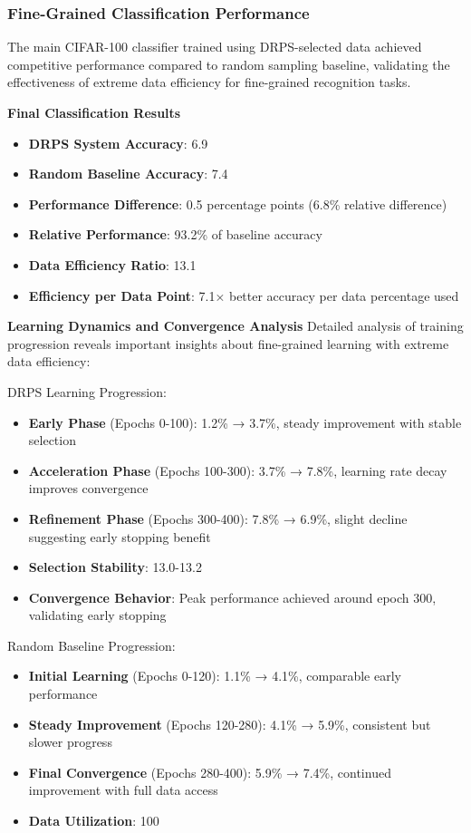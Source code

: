 \documentclass[12pt]{article}
\begin{document}
\subsubsection{Fine-Grained Classification Performance}\label{classification-performance}

The main CIFAR-100 classifier trained using DRPS-selected data achieved competitive performance compared to random sampling baseline, validating the effectiveness of extreme data efficiency for fine-grained recognition tasks.

\textbf{Final Classification Results}
\begin{itemize}
\item \textbf{DRPS System Accuracy}: 6.9%
\item \textbf{Random Baseline Accuracy}: 7.4%
\item \textbf{Performance Difference}: 0.5 percentage points (6.8\% relative difference)
\item \textbf{Relative Performance}: 93.2\% of baseline accuracy
\item \textbf{Data Efficiency Ratio}: 13.1%
\item \textbf{Efficiency per Data Point}: 7.1× better accuracy per data percentage used
\end{itemize}

\textbf{Learning Dynamics and Convergence Analysis}
Detailed analysis of training progression reveals important insights about fine-grained learning with extreme data efficiency:

DRPS Learning Progression:
\begin{itemize}
\item \textbf{Early Phase} (Epochs 0-100): 1.2\% → 3.7\%, steady improvement with stable selection
\item \textbf{Acceleration Phase} (Epochs 100-300): 3.7\% → 7.8\%, learning rate decay improves convergence
\item \textbf{Refinement Phase} (Epochs 300-400): 7.8\% → 6.9\%, slight decline suggesting early stopping benefit
\item \textbf{Selection Stability}: 13.0-13.2%
\item \textbf{Convergence Behavior}: Peak performance achieved around epoch 300, validating early stopping
\end{itemize}

Random Baseline Progression:
\begin{itemize}
\item \textbf{Initial Learning} (Epochs 0-120): 1.1\% → 4.1\%, comparable early performance
\item \textbf{Steady Improvement} (Epochs 120-280): 4.1\% → 5.9\%, consistent but slower progress
\item \textbf{Final Convergence} (Epochs 280-400): 5.9\% → 7.4\%, continued improvement with full data access
\item \textbf{Data Utilization}: 100%
\end{itemize}
\end{document}

